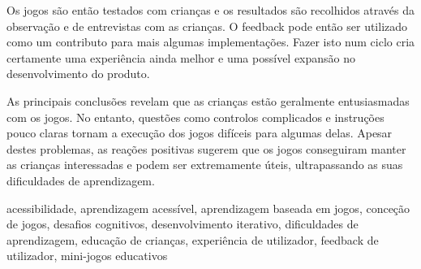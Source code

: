 Os jogos são então testados com crianças e os resultados são recolhidos através da observação e de entrevistas com as crianças. O feedback pode então ser utilizado como um contributo para mais algumas implementações. Fazer isto num ciclo cria certamente uma experiência ainda melhor e uma possível expansão no desenvolvimento do produto.

As principais conclusões revelam que as crianças estão geralmente entusiasmadas com os jogos. No entanto, questões como controlos complicados e instruções pouco claras tornam a execução dos jogos difíceis para
algumas delas. Apesar destes problemas, as reações positivas sugerem que os jogos conseguiram manter as crianças interessadas e podem ser extremamente úteis, ultrapassando as suas dificuldades de aprendizagem.

\begin{keywords}
	acessibilidade, aprendizagem acessível, aprendizagem baseada em jogos, conceção de jogos, desafios cognitivos, desenvolvimento iterativo, dificuldades de aprendizagem, educação de crianças, experiência de utilizador, feedback de utilizador, mini-jogos educativos
\end{keywords}
	
